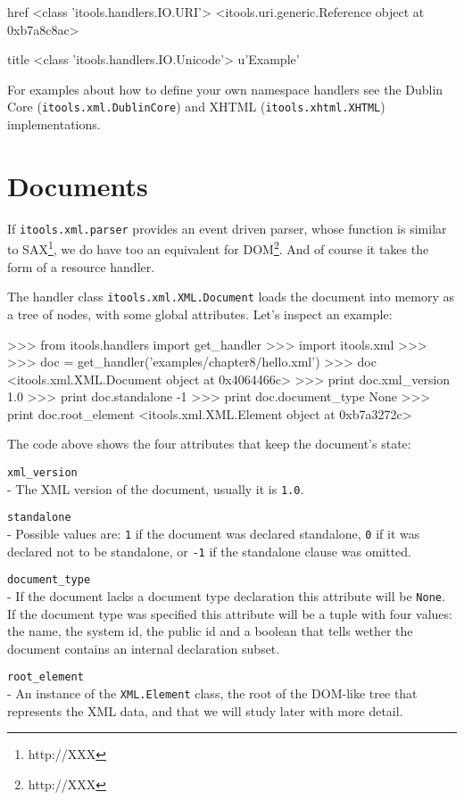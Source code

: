 \begin{code}
    href <class 'itools.handlers.IO.URI'>
    <itools.uri.generic.Reference object at 0xb7a8c8ac>

    title <class 'itools.handlers.IO.Unicode'>
    u'Example'
\end{code}

For examples about how to define your own namespace handlers see the Dublin
Core ({\tt itools.xml.DublinCore}) and XHTML ({\tt itools.xhtml.XHTML})
implementations.


\section{Documents}

If {\tt itools.xml.parser} provides an event driven parser, whose function
is similar to SAX\footnote{http://XXX}, we do have too an equivalent for
DOM\footnote{http://XXX}. And of course it takes the form of a resource
handler.

The handler class {\tt itools.xml.XML.Document} loads the document into memory
as a tree of nodes, with some global attributes. Let's inspect an example:

\begin{code}
    >>> from itools.handlers import get_handler
    >>> import itools.xml
    >>>
    >>> doc = get_handler('examples/chapter8/hello.xml')
    >>> doc
    <itools.xml.XML.Document object at 0x4064466c>
    >>> print doc.xml_version
    1.0
    >>> print doc.standalone 
    -1
    >>> print doc.document_type
    None
    >>> print doc.root_element
    <itools.xml.XML.Element object at 0xb7a3272c>
\end{code}

The code above shows the four attributes that keep the document's state:

\begin{api}
    {\tt xml\_version}\\
    - The XML version of the document, usually it is {\tt 1.0}.

    {\tt standalone}\\
    - Possible values are: {\tt 1} if the document was declared standalone,
      {\tt 0} if it was declared not to be standalone, or {\tt -1} if the
      standalone clause was omitted.

    {\tt document\_type}\\
    - If the document lacks a document type declaration this attribute will
      be {\tt None}. If the document type was specified this attribute will
      be a tuple with four values: the name, the system id, the public id
      and a boolean that tells wether the document contains an internal
      declaration subset.

    {\tt root\_element}\\
    - An instance of the {\tt XML.Element} class, the root of the DOM-like
      tree that represents the XML data, and that we will study later with
      more detail.
\end{api}


